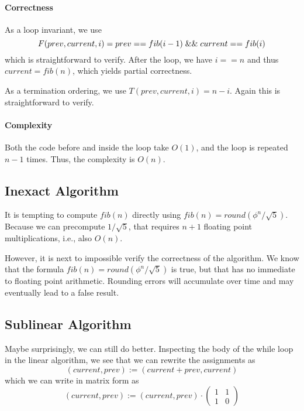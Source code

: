 \paragraph{Correctness}
As a loop invariant, we use
\[F(prev,current,i) = prev==fib(i-1)\;\&\&\; current==fib(i)\]
which is straightforward to verify.
After the loop, we have $i==n$ and thus $current=fib(n)$, which yields partial correctness.

As a termination ordering, we use $T(prev,current,i)=n-i$.
Again this is straightforward to verify.

\paragraph{Complexity}
Both the code before and inside the loop take $O(1)$, and the loop is repeated $n-1$ times.
Thus, the complexity is $O(n)$.

\subsection{Inexact Algorithm}\label{sec:ad:fib:inexact}

It is tempting to compute $fib(n)$ directly using $fib(n)=round(\phi^n/\sqrt{5})$.
Because we can precompute $1/\sqrt{5}$, that requires $n+1$ floating point multiplications, i.e., also $O(n)$.

However, it is next to impossible verify the correctness of the algorithm.
We know that the formula $fib(n)=round(\phi^n/\sqrt{5})$ is true, but that has no immediate to floating point arithmetic.
Rounding errors will accumulate over time and may eventually lead to a false result.


\subsection{Sublinear Algorithm}\label{sec:ad:fib:sublinear}

Maybe surprisingly, we can still do better.
Inspecting the body of the while loop in the linear algorithm, we see that we can rewrite the assignments as
\[(current,prev):=(current+prev, current)\]
which we can write in matrix form as
\[(current,prev):=(current,prev)\cdot\begin{pmatrix}1&1\\1&0\end{pmatrix}\]

